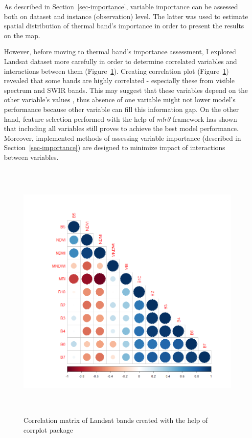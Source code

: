 \documentclass{amuthesis}
\begin{document}
As described in Section~\ref{sec-importance}, variable importance can be
assessed both on dataset and instance (observation) level. The latter
was used to estimate spatial distribution of thermal band's importance
in order to present the results on the map.

However, before moving to thermal band's importance assessment, I
explored Landsat dataset more carefully in order to determine correlated
variables and interactions between them (Figure~\ref{fig-rycina19}).
Creating correlation plot (Figure~\ref{fig-rycina19}) revealed that some
bands are highly correlated - especially these from visible spectrum and
SWIR bands. This may suggest that these variables depend on the other
variable's values \autocite{biecek_explanatory_2021}, thus absence of
one variable might not lower model's performance because other variable
can fill this information gap. On the other hand, feature selection
performed with the help of \emph{mlr3} framework \autocite{R-mlr3} has
shown that including all variables still proves to achieve the best
model performance. Moreover, implemented methods of assessing variable
importance (described in Section~\ref{sec-importance}) are designed to
minimize impact of interactions between variables.

\begin{figure}[H]

{\centering \includegraphics[width=5.57292in,height=5.20833in]{./figures/corrplot.png}

}

\caption{\label{fig-rycina19}Correlation matrix of Landsat bands created
with the help of corrplot package}

\end{figure}
\end{document}
